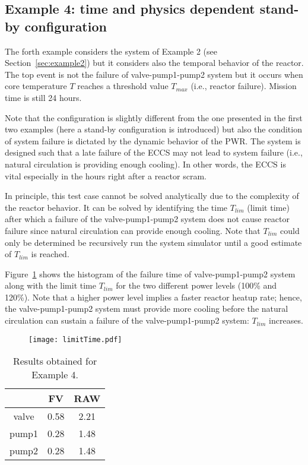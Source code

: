 \subsection{Example 4: time and physics dependent stand-by configuration}
\label{sec:example4}

The forth example considers the system of Example 2 (see Section~\ref{sec:example2}) but it considers 
also the temporal behavior of the reactor.
The top event is not the failure of valve-pump1-pump2 system but it occurs when core temperature $T$
reaches a threshold value $T_{max}$ (i.e., reactor failure). 
Mission time is still 24 hours.

Note that the configuration is slightly different from the one presented in the first two 
examples (here a stand-by configuration is introduced) but also the condition of system failure 
is dictated by the dynamic behavior of the PWR. The system is designed such that a late failure 
of the ECCS may not lead to system failure (i.e., natural circulation is providing enough cooling). 
In other words, the ECCS is vital especially in the hours right after a reactor scram.

In principle, this test case cannot be solved analytically due to the complexity of the reactor 
behavior. It can be solved by identifying the time $T_{lim}$ (limit time) after which a 
failure of the valve-pump1-pump2 system does not cause reactor failure since natural circulation
can provide enough cooling.
Note that $T_{lim}$ could only be determined be recursively run the system simulator until a 
good estimate of $T_{lim}$ is reached.

Figure~\ref{fig:limitTime} shows the histogram of the failure time of valve-pump1-pump2 system along 
with the limit time $T_{lim}$ for the two different power levels (100\% and 120\%). 
Note that a higher power level implies a faster reactor heatup rate; hence, the 
valve-pump1-pump2 system must provide more cooling before the natural circulation can sustain a failure
of the valve-pump1-pump2 system: $T_{lim}$ increases.

\begin{figure}
    \centering
    \centerline{\texttt{[image: limitTime.pdf]}}
    \caption{}
    \label{fig:limitTime}
\end{figure}

\begin{table}
  \caption{Results obtained for Example 4.}
  \centering
  \begin{tabular}{c | c | c }
    \hline
          & FV & RAW \\
    \hline
    valve & 0.58 & 2.21  \\
    pump1 & 0.28 & 1.48  \\
    pump2 & 0.28 & 1.48  \\
    \hline
  \end{tabular}
  \label{tab:example4}
\end{table}

